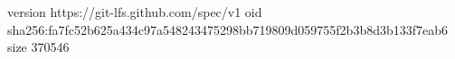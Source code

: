 version https://git-lfs.github.com/spec/v1
oid sha256:fa7fc52b625a434c97a548243475298bb719809d059755f2b3b8d3b133f7eab6
size 370546

